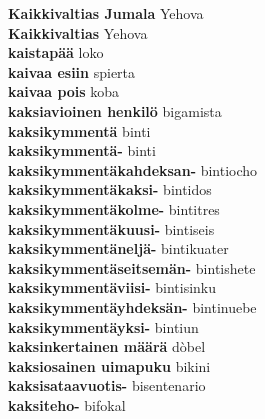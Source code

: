 \textbf{ Kaikkivaltias Jumala  } Yehova \\
\textbf{ Kaikkivaltias  } Yehova \\
\textbf{ kaistapää  } loko \\
\textbf{ kaivaa esiin  } spierta \\
\textbf{ kaivaa pois  } koba \\
\textbf{ kaksiavioinen henkilö  } bigamista \\
\textbf{ kaksikymmentä  } binti \\
\textbf{ kaksikymmentä-  } binti \\
\textbf{ kaksikymmentäkahdeksan-  } bintiocho \\
\textbf{ kaksikymmentäkaksi-  } bintidos \\
\textbf{ kaksikymmentäkolme-  } bintitres \\
\textbf{ kaksikymmentäkuusi-  } bintiseis \\
\textbf{ kaksikymmentäneljä-  } bintikuater \\
\textbf{ kaksikymmentäseitsemän-  } bintishete \\
\textbf{ kaksikymmentäviisi-  } bintisinku \\
\textbf{ kaksikymmentäyhdeksän-  } bintinuebe \\
\textbf{ kaksikymmentäyksi-  } bintiun \\
\textbf{ kaksinkertainen määrä  } dòbel \\
\textbf{ kaksiosainen uimapuku  } bikini \\
\textbf{ kaksisataavuotis-  } bisentenario \\
\textbf{ kaksiteho-  } bifokal \\

